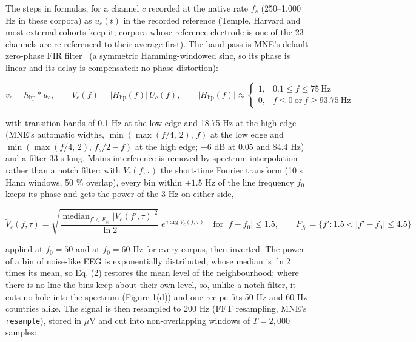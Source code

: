 \documentclass[11pt,a4paper]{article}
\begin{document}
The steps in formulas, for a channel $c$ recorded at the native rate $f_s$ (250--1,000 Hz in these corpora) as $u_c(t)$ in the recorded reference (Temple, Harvard and most external cohorts keep it; corpora whose reference electrode is one of the 23 channels are re-referenced to their average first). The band-pass is MNE's default zero-phase FIR filter~\citep{gramfort2013mne} (a symmetric Hamming-windowed sinc, so its phase is linear and its delay is compensated: no phase distortion):

\begin{equation}
v_c = h_{\mathrm{bp}} * u_c, \qquad V_c(f) = \lvert H_{\mathrm{bp}}(f) \rvert\, U_c(f), \qquad \lvert H_{\mathrm{bp}}(f)\rvert \approx \begin{cases} 1, & 0.1 \le f \le 75\ \mathrm{Hz} \\ 0, & f \le 0\ \text{or}\ f \ge 93.75\ \mathrm{Hz} \end{cases} \tag{1}
\end{equation}

with transition bands of 0.1 Hz at the low edge and 18.75 Hz at the high edge (MNE's automatic widths, $\min(\max(f/4,\,2),\,f)$ at the low edge and $\min(\max(f/4,\,2),\,f_s/2-f)$ at the high edge; $-$6 dB at 0.05 and 84.4 Hz) and a filter 33 s long. Mains interference is removed by spectrum interpolation~\citep{leske2019interpolation} rather than a notch filter: with $V_c(f,\tau)$ the short-time Fourier transform (10 s Hann windows, 50 \% overlap), every bin within $\pm 1.5$ Hz of the line frequency $f_0$ keeps its phase and gets the power of the 3 Hz on either side,

\begin{equation}
\tilde V_c(f,\tau) = \sqrt{\frac{\operatorname{median}_{f' \in F_{f_0}} \lvert V_c(f',\tau)\rvert^2}{\ln 2}}\; e^{\,i \arg V_c(f,\tau)} \quad \text{for } \lvert f - f_0 \rvert \le 1.5, \qquad F_{f_0} = \{ f' : 1.5 < \lvert f' - f_0 \rvert \le 4.5 \} \tag{2}
\end{equation}

applied at $f_0 = 50$ and at $f_0 = 60$ Hz for every corpus, then inverted. The power of a bin of noise-like EEG is exponentially distributed, whose median is $\ln 2$ times its mean, so Eq. (2) restores the mean level of the neighbourhood; where there is no line the bins keep about their own level, so, unlike a notch filter, it cuts no hole into the spectrum (Figure 1(d)) and one recipe fits 50 Hz and 60 Hz countries alike. The signal is then resampled to 200 Hz (FFT resampling, MNE's \texttt{resample}), stored in $\mu$V and cut into non-overlapping windows of $T = 2{,}000$ samples:
\end{document}
